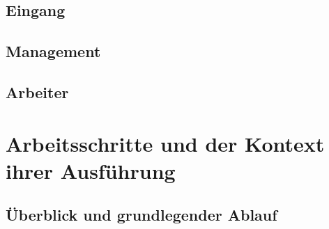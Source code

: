 \subsection{Eingang}
\subsection{Management}
\subsection{Arbeiter}

\section{Arbeitsschritte und der Kontext ihrer Ausführung}

\subsection{Überblick und grundlegender Ablauf}

